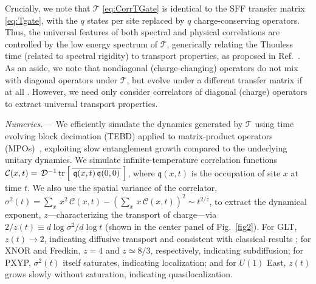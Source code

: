 \documentclass[prl,aps,amsfonts,twocolumn,superscriptaddress,notitlepage,floatfix]{revtex4-1}
\newcommand{\tr}[1]{{\rm tr} \left[ #1 \right]}
\def\Tmat{\mathcal{T}}
\def\Tgate{T}
\def\Hdim{\mathcal{D}}
\def\Ldim{q}
\def\charge{\mathfrak{q}}
\def\Corr{\mathcal{C}}
\begin{document}
Crucially, we note that $\Tmat$ \eqref{eq:CorrTGate} is identical to the SFF transfer matrix \eqref{eq:Tgate}, with the $\Ldim$ states per site replaced by $\Ldim$ charge-conserving operators. Thus, the universal features of both spectral and physical correlations are controlled by the low energy spectrum of $\Tmat$, generically relating the Thouless time (related to spectral rigidity) to transport properties, as proposed in Ref.~. 
As an aside, we note that nondiagonal (charge-changing) operators do not mix with diagonal operators under $\Tmat$, but evolve under a different transfer matrix if at all \cite{supp}. %
However, we need only consider correlators of diagonal (charge) operators to extract universal transport properties.

\noindent \emph{Numerics.---}\, 
We efficiently simulate the dynamics generated by $\Tmat$ using time evolving block decimation (TEBD) applied to matrix-product operators (MPOs)~\cite{PhysRevLett.91.147902,PhysRevLett.93.207204,PhysRevLett.93.040502,SCHOLLWOCK201196}, exploiting slow entanglement growth compared to the underlying unitary dynamics. We simulate infinite-temperature correlation functions $\Corr (x,t) = \, \Hdim^{-1} \, \tr{ \, \overline{ \, \charge (x, t) \, \charge (0,0) \,} \,}$, where $\charge (x,t)$ is the occupation of site $x$ at time $t$. %
We also use the spatial variance of %
the correlator,~$\sigma^{2}(t) = \sum_{x} \, x^2 \, \Corr(x,t) - (\sum_{x} \, x \, \Corr(x,t))^{2} \sim t^{2/z}$, to extract
the dynamical exponent, $z$---characterizing the transport of charge---via %
$2/z(t) \equiv   d \log \sigma^2 / d \log t $ (shown in the center panel of Fig.~\ref{fig2}).
For GLT, $z(t) \to 2$, indicating diffusive transport and consistent with classical results \cite{GLT}; for XNOR and Fredkin, $z=4$ and $z \simeq 8/3$, respectively, indicating subdiffusion; 
for PXYP, $\sigma^{2}(t)$ itself saturates, indicating localization; and for $U(1)$ East, $z(t)$ grows slowly without saturation, indicating %
quasilocalization.
\end{document}
